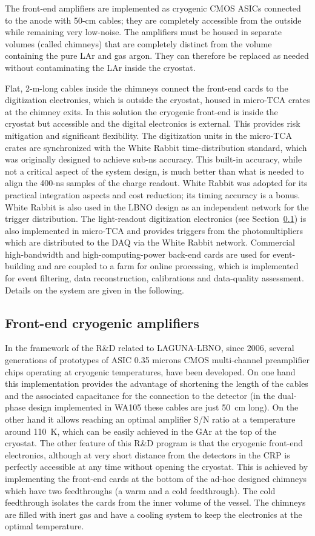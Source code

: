 The front-end amplifiers are implemented as cryogenic CMOS ASICs connected to the anode with 50-cm cables; they are completely
accessible from the outside while remaining very low-noise. The amplifiers must be housed in separate volumes (called chimneys) that are 
completely distinct from the volume containing the pure LAr and gas argon. They  can therefore be replaced as needed without contaminating the LAr inside the  cryostat. 

Flat, 2-m-long cables inside the chimneys connect the front-end cards to the digitization electronics, which is outside the cryostat, housed  in
micro-TCA crates at the chimney exits.  In this solution the cryogenic front-end is inside the cryostat but accessible and the digital electronics 
is external.  This  provides risk mitigation and significant flexibility. The digitization units in the micro-TCA crates are synchronized with the White Rabbit
time-distribution standard, \cite{white-rabbit} which was originally designed to achieve sub-ns accuracy. 
%
This built-in accuracy, while not a critical aspect of the system design, is much better than what is needed to align the 400-ns samples of
the charge readout.  White Rabbit was adopted for its practical integration aspects and cost reduction; its timing accuracy is a bonus.
White Rabbit is also used in the LBNO design as an independent network for the trigger distribution. The light-readout digitization electronics (see Section~\ref{}) is also implemented in micro-TCA and provides triggers from the photomultipliers which are distributed to the DAQ via the White Rabbit
network. Commercial high-bandwidth and high-computing-power back-end cards are used for event-building and are coupled to a farm for online
processing, which is implemented for event filtering, data reconstruction, calibrations and data-quality assessment. Details on the system are given in the following. 


\subsection{Front-end cryogenic amplifiers}
In the framework of the R\&D related to LAGUNA-LBNO, since 2006, several generations of prototypes of ASIC 0.35 microns CMOS
multi-channel preamplifier chips operating at cryogenic temperatures, have been developed. On one hand this implementation provides the
advantage of shortening the length of the cables and the associated capacitance for the connection to the detector (in the dual-phase
design implemented in WA105 these cables are just 50~cm long). On the other hand it allows reaching an optimal amplifier S/N ratio at a
temperature around 110~K, which can be easily achieved in the GAr at the top of the cryostat. The other feature of this R\&D program is
that the cryogenic front-end electronics, although at very short distance from the detectors in the CRP is perfectly accessible at any
time without opening the cryostat. This is achieved by implementing the front-end cards at the bottom of the ad-hoc designed chimneys
which have two feedthroughs (a warm and a cold feedthrough). The cold feedthrough isolates the cards from the inner volume of the
vessel. The chimneys are filled with inert gas and have a cooling system to keep the electronics at the optimal temperature.

